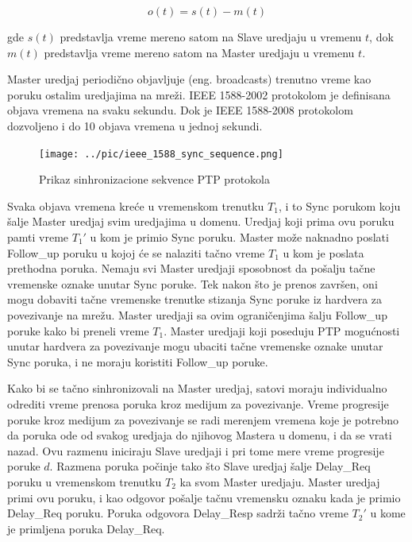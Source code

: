 \documentclass[a4paper,12pt, master]{etf}
\begin{document}
	\begin{equation}
		o(t) = s(t) - m(t)
	\end{equation}

	\noindent gde $s(t)$ predstavlja vreme mereno satom na Slave uredjaju u
    vremenu $t$, dok $m(t)$ predstavlja vreme mereno satom na Master uredjaju u
    vremenu $t$.

	Master uredjaj periodi\v{c}no objavljuje (eng\@. broadcasts) trenutno vreme
    kao poruku ostalim uredjajima na mre\v{z}i. IEEE 1588-2002 protokolom je
	definisana objava vremena na svaku sekundu. Dok je IEEE 1588-2008
	protokolom dozvoljeno i do 10 objava vremena u jednoj sekundi.

	\begin{figure}[htb]
			\centering
			\texttt{[image: ../pic/ieee\_1588\_sync\_sequence.png]}
			\caption{Prikaz sinhronizacione sekvence PTP protokola}
			\label{fig:ieee_1588_sync_sequence}
	\end{figure}

	Svaka objava vremena kre\'{c}e u vremenskom trenutku $T_1$, i to Sync
	porukom koju \v{s}alje Master uredjaj svim uredjajima u domenu. Uredjaj
	koji prima ovu poruku pamti vreme $T_1'$ u kom je primio Sync poruku.
	Master mo\v{z}e naknadno poslati Follow\_up poruku u kojoj \'{c}e se
	nalaziti ta\v{c}no vreme $T_1$ u kom je poslata prethodna poruka. Nemaju
	svi Master uredjaji sposobnost da po\v{s}alju ta\v{c}ne vremenske oznake
	unutar Sync poruke. Tek nakon \v{s}to je prenos zavr\v{s}en, oni mogu
	dobaviti ta\v{c}ne vremenske trenutke stizanja Sync poruke iz hardvera za
	povezivanje na mre\v{z}u. Master uredjaji sa ovim ograni\v{c}enjima
	\v{s}alju Follow\_up poruke kako bi preneli vreme $T_1$. Master uredjaji
	koji poseduju PTP mogu\'{c}nosti unutar hardvera za povezivanje mogu
	ubaciti ta\v{c}ne vremenske oznake unutar Sync poruka, i ne moraju
	koristiti Follow\_up poruke.

	Kako bi se ta\v{c}no sinhronizovali na Master uredjaj, satovi moraju
	individualno odrediti vreme prenosa poruka kroz medijum za povezivanje.
	Vreme progresije poruke kroz medijum za	povezivanje	se radi merenjem
	vremena koje je potrebno da poruka ode od svakog uredjaja do njihovog
	Mastera u domenu, i da se vrati nazad. Ovu razmenu iniciraju Slave uredjaji
	i pri tome mere vreme progresije poruke $d$. Razmena poruka po\v{c}inje
	tako \v{s}to Slave uredjaj \v{s}alje Delay\_Req poruku u vremenskom
	trenutku $T_2$ ka svom Master uredjaju. Master uredjaj primi ovu poruku, i
	kao	odgovor po\v{s}alje ta\v{c}nu vremensku oznaku kada je primio Delay\_Req
    poruku. Poruka odgovora Delay\_Resp sadr\v{z}i ta\v{c}no vreme $T_2'$ u kome
    je primljena poruka Delay\_Req.
\end{document}
